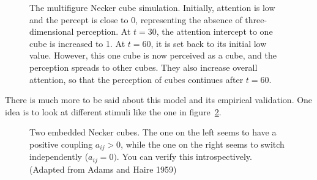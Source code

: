 \documentclass[
  a4paper,
  DIV=11,
  numbers=noendperiod,
  oneside]{scrreprt}
\begin{document}
\begin{figure}


\caption{\label{fig-ch4n-img19-old-67}The multifigure Necker cube
simulation. Initially, attention is low and the percept is close to 0,
representing the absence of three-dimensional perception. At \(t = 30\),
the attention intercept to one cube is increased to 1. At \(t = 60\), it
is set back to its initial low value. However, this one cube is now
perceived as a cube, and the perception spreads to other cubes. They
also increase overall attention, so that the perception of cubes
continues after \(t = 60\).}

\end{figure}%

There is much more to be said about this model and its empirical
validation. One idea is to look at different stimuli like the one in
figure~\ref{fig-ch4n-img20-old-68}.

\begin{figure}


\caption{\label{fig-ch4n-img20-old-68}Two embedded Necker cubes. The one
on the left seems to have a positive coupling \(a_{ij} > 0\), while the
one on the right seems to switch independently (\(a_{ij} = 0)\). You can
verify this introspectively. (Adapted from Adams and Haire 1959)}

\end{figure}%
\end{document}
